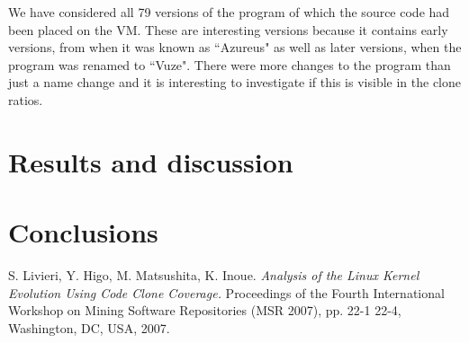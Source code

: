 \documentclass[a4paper,twoside, twocolumn, 11pt]{article}
\numberwithin{equation}{section}
\begin{document}
We have considered all 79 versions of the program of which the source code had been placed on the VM. 
These are interesting versions because it contains early versions, from when it was known as ``Azureus" as well as later versions, when the program was renamed to ``Vuze".
There were more changes to the program than just a name change %
and it is interesting to investigate if this is visible in the clone ratios. %

\section{Results and discussion}

\section{Conclusions}

\begin{thebibliography}{9}
S. Livieri, Y. Higo, M. Matsushita, K. Inoue. \emph{Analysis of the Linux Kernel Evolution Using Code Clone Coverage.} Proceedings of the Fourth International Workshop on Mining Software Repositories (MSR 2007),  pp. 22-1 22-4, Washington, DC, USA, 2007.
\end{thebibliography}
\end{document}
